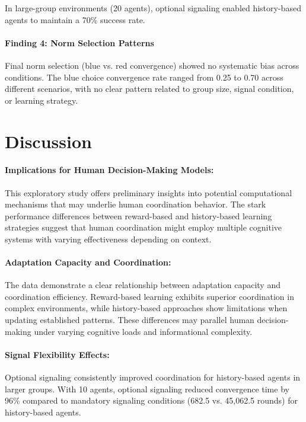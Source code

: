\documentclass[12pt,a4paper]{article}
\begin{document}
In large-group environments (20 agents), optional signaling enabled history-based agents to maintain a 70\% success rate.

\paragraph{Finding 4: Norm Selection Patterns} 
Final norm selection (blue vs. red convergence) showed no systematic bias across conditions. The blue choice convergence rate ranged from 0.25 to 0.70 across different scenarios, with no clear pattern related to group size, signal condition, or learning strategy.

\section{Discussion}

\paragraph{Implications for Human Decision-Making Models:} 
This exploratory study offers preliminary insights into potential computational mechanisms that may underlie human coordination behavior. The stark performance differences between reward-based and history-based learning strategies suggest that human coordination might employ multiple cognitive systems with varying effectiveness depending on context.

\paragraph{Adaptation Capacity and Coordination:} 
The data demonstrate a clear relationship between adaptation capacity and coordination efficiency. Reward-based learning exhibits superior coordination in complex environments, while history-based approaches show limitations when updating established patterns. These differences may parallel human decision-making under varying cognitive loads and informational complexity.

\paragraph{Signal Flexibility Effects:} 
Optional signaling consistently improved coordination for history-based agents in larger groups. With 10 agents, optional signaling reduced convergence time by 96\% compared to mandatory signaling conditions (682.5 vs. 45,062.5 rounds) for history-based agents.
\end{document}
